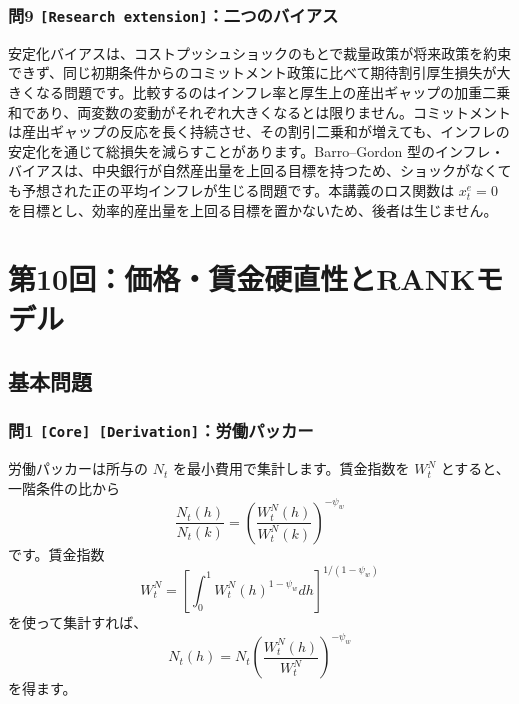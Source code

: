 \documentclass[
  japanese,
  lualatex,
  ja=standard,
  11pt,
  a4paper]{ltjsarticle}
\begin{document}

\subsubsection{\texorpdfstring{問9
\texttt{{[}Research\ extension{]}}：二つのバイアス}{問9 {[}Research extension{]}：二つのバイアス}}\label{ux554f9-research-extensionux4e8cux3064ux306eux30d0ux30a4ux30a2ux30b9}

安定化バイアスは、コストプッシュショックのもとで裁量政策が将来政策を約束できず、同じ初期条件からのコミットメント政策に比べて期待割引厚生損失が大きくなる問題です。比較するのはインフレ率と厚生上の産出ギャップの加重二乗和であり、両変数の変動がそれぞれ大きくなるとは限りません。コミットメントは産出ギャップの反応を長く持続させ、その割引二乗和が増えても、インフレの安定化を通じて総損失を減らすことがあります。Barro--Gordon
型のインフレ・バイアスは、中央銀行が自然産出量を上回る目標を持つため、ショックがなくても予想された正の平均インフレが生じる問題です。本講義のロス関数は
\(x_t^e=0\)
を目標とし、効率的産出量を上回る目標を置かないため、後者は生じません。

\clearpage

\section{第10回：価格・賃金硬直性とRANKモデル}\label{ux7b2c10ux56deux4fa1ux683cux8cc3ux91d1ux786cux76f4ux6027ux3068rankux30e2ux30c7ux30eb}

\subsection{基本問題}\label{ux57faux672cux554fux984c-9}

\subsubsection{\texorpdfstring{問1
\texttt{{[}Core{]}\ {[}Derivation{]}}：労働パッカー}{問1 {[}Core{]} {[}Derivation{]}：労働パッカー}}\label{ux554f1-core-derivationux52b4ux50cdux30d1ux30c3ux30abux30fc}

労働パッカーは所与の \(N_t\) を最小費用で集計します。賃金指数を
\(W_t^N\) とすると、一階条件の比から \[
\frac{N_t(h)}{N_t(k)}
=\left(\frac{W_t^N(h)}{W_t^N(k)}\right)^{-\psi_w}
\] です。賃金指数 \[
W_t^N
=\left[\int_0^1W_t^N(h)^{1-\psi_w}dh\right]^{1/(1-\psi_w)}
\] を使って集計すれば、 \[
N_t(h)=N_t\left(\frac{W_t^N(h)}{W_t^N}\right)^{-\psi_w}
\] を得ます。
\end{document}
